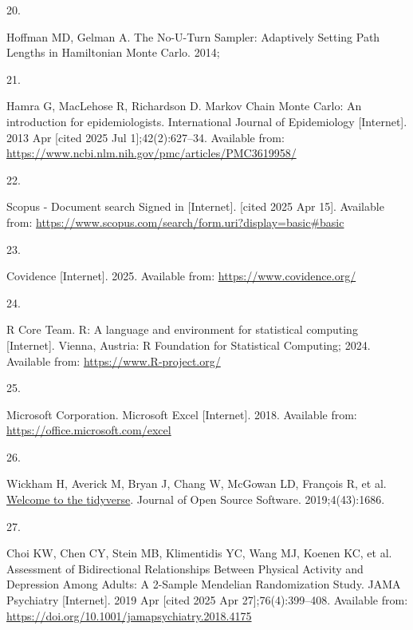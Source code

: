 \documentclass[
]{article}
\newlength{\cslhangindent}
\newlength{\csllabelwidth}
\newenvironment{CSLReferences}[2] %
 {\begin{list}{}{%
  \setlength{\itemindent}{0pt}
  \setlength{\leftmargin}{0pt}
  \setlength{\parsep}{0pt}
  \ifodd #1
   \setlength{\leftmargin}{\cslhangindent}
   \setlength{\itemindent}{-1\cslhangindent}
  \fi
  \setlength{\itemsep}{#2\baselineskip}}}
 {\end{list}}
\newcommand{\CSLLeftMargin}[1]{\parbox[t]{\csllabelwidth}{\strut#1\strut}}
\newcommand{\CSLRightInline}[1]{\parbox[t]{\linewidth - \csllabelwidth}{\strut#1\strut}}
\begin{document}
\begin{CSLReferences}{0}{1}
\CSLLeftMargin{20. }%
\CSLRightInline{Hoffman MD, Gelman A. The {No}-{U}-{Turn} {Sampler}: {Adaptively} {Setting} {Path} {Lengths} in {Hamiltonian} {Monte} {Carlo}. 2014; }

\CSLLeftMargin{21. }%
\CSLRightInline{Hamra G, MacLehose R, Richardson D. Markov {Chain} {Monte} {Carlo}: An introduction for epidemiologists. International Journal of Epidemiology {[}Internet{]}. 2013 Apr {[}cited 2025 Jul 1{]};42(2):627--34. Available from: \url{https://www.ncbi.nlm.nih.gov/pmc/articles/PMC3619958/}}

\CSLLeftMargin{22. }%
\CSLRightInline{Scopus - {Document} search {\textbar} {Signed} in {[}Internet{]}. {[}cited 2025 Apr 15{]}. Available from: \url{https://www.scopus.com/search/form.uri?display=basic\#basic}}

\CSLLeftMargin{23. }%
\CSLRightInline{Covidence {[}Internet{]}. 2025. Available from: \url{https://www.covidence.org/}}

\CSLLeftMargin{24. }%
\CSLRightInline{R Core Team. {R}: A language and environment for statistical computing {[}Internet{]}. Vienna, Austria: R Foundation for Statistical Computing; 2024. Available from: \url{https://www.R-project.org/}}

\CSLLeftMargin{25. }%
\CSLRightInline{Microsoft Corporation. Microsoft {Excel} {[}Internet{]}. 2018. Available from: \url{https://office.microsoft.com/excel}}

\CSLLeftMargin{26. }%
\CSLRightInline{Wickham H, Averick M, Bryan J, Chang W, McGowan LD, François R, et al. \href{https://doi.org/10.21105/joss.01686}{Welcome to the {tidyverse}}. Journal of Open Source Software. 2019;4(43):1686. }

\CSLLeftMargin{27. }%
\CSLRightInline{Choi KW, Chen CY, Stein MB, Klimentidis YC, Wang MJ, Koenen KC, et al. Assessment of {Bidirectional} {Relationships} {Between} {Physical} {Activity} and {Depression} {Among} {Adults}: {A} 2-{Sample} {Mendelian} {Randomization} {Study}. JAMA Psychiatry {[}Internet{]}. 2019 Apr {[}cited 2025 Apr 27{]};76(4):399--408. Available from: \url{https://doi.org/10.1001/jamapsychiatry.2018.4175}}


\end{CSLReferences}
\end{document}
